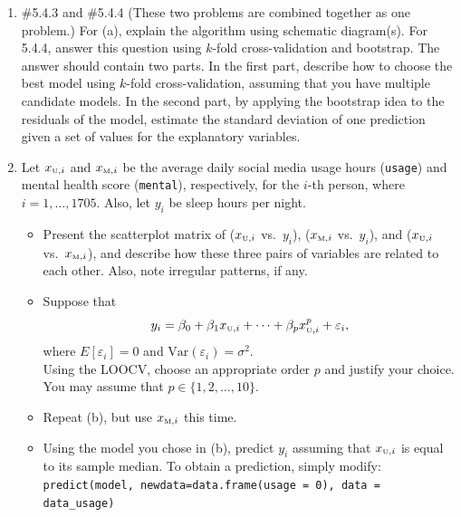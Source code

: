 \documentclass[12pt]{article}
\begin{document}
\begin{enumerate}
\item  \#5.4.3 and \#5.4.4 (These two problems are combined together as one problem.) For (a), explain the algorithm using schematic diagram(s). For 5.4.4, answer this question using $k$-fold cross-validation and bootstrap. The answer should contain two parts. In the first part, describe how to choose the best model using $k$-fold cross-validation, assuming that you have multiple candidate models. In the second part, by applying the bootstrap idea to the residuals of the model, estimate the standard deviation of one prediction given a set of values for the explanatory variables.\\

\item Let $x_{\mbox{\tiny U},i}$ and $x_{\mbox{\tiny M},i}$ be the average daily social media usage hours ({\tt usage}) and mental health score ({\tt mental}), respectively, for the $i$-th person, where $i = 1,\ldots, 1705$. Also, let $y_i$ be sleep hours per night. 
\begin{itemize}
\item[(a)] Present the scatterplot matrix of ($x_{\mbox{\tiny U},i}$ vs.\ $y_i$), ($x_{\mbox{\tiny M},i}$ vs.\ $y_i$), and ($x_{\mbox{\tiny U},i}$ vs.\ $x_{\mbox{\tiny M},i}$), and describe how these three pairs of variables are related to each other. Also, note irregular patterns, if any.\\
\item[(b)] Suppose that 
\begin{eqnarray*}
y_i = \beta_0 + \beta_1 x_{\mbox{\tiny U},i} + \cdots + \beta_p x_{\mbox{\tiny U},i}^p + \varepsilon_i,
\end{eqnarray*}
where $E[\varepsilon_i] = 0$ and $\mbox{Var}(\varepsilon_i) = \sigma^2$.\\

Using the LOOCV, choose an appropriate order $p$ and justify your choice. You may assume that $p \in \{1, 2, \ldots, 10\}$.\\
\item[(c)] Repeat (b), but use $x_{\mbox{\tiny M},i}$ this time.
\item[(d)] Using the model you chose in (b), predict $y_i$ assuming that $x_{\mbox{\tiny U},i}$ is equal to its sample median. To obtain a prediction, simply modify: \\

\small
{\tt predict(model, newdata=data.frame(usage = 0), data = data\_usage)\\}
\normalsize


\end{itemize}
\end{enumerate}
\end{document}
